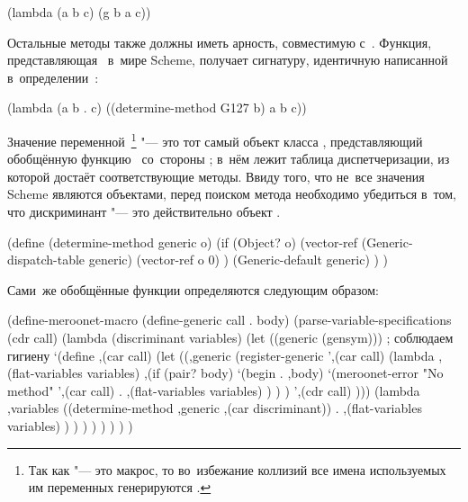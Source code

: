 \begin{code:lisp}
(lambda (a b c) (g b a c))
\end{code:lisp}

Остальные методы также должны иметь арность, совместимую с~.
Функция, представляющая~ в~мире Scheme, получает сигнатуру, идентичную
написанной в~определении~:

\begin{code:lisp}
(lambda (a b . c) ((determine-method G127 b) a b c))
\end{code:lisp}

Значение переменной~\footnote{Так как  "--- это
макрос, то во~избежание коллизий все имена используемых им  переменных
генерируются .} "--- это тот самый объект класса ,
представляющий обобщённую функцию~ со~стороны {\Meroonet}; в~нём лежит
таблица диспетчеризации, из которой  достаёт
соответствующие методы. Ввиду того, что не~все значения Scheme являются
объектами, перед поиском метода необходимо убедиться в~том, что дискриминант
"--- это действительно объект {\Meroonet}.

\begin{code:lisp}
(define (determine-method generic o)
  (if (Object? o)
      (vector-ref (Generic-dispatch-table generic)
                  (vector-ref o 0) )
      (Generic-default generic) ) )
\end{code:lisp}

Сами~же обобщённые функции определяются следующим образом:
%
\begin{code:lisp}
(define-meroonet-macro (define-generic call . body)
  (parse-variable-specifications
   (cdr call)
   (lambda (discriminant variables)
     (let ((generic (gensym)))      ; соблюдаем гигиену
       `(define ,(car call)
          (let ((,generic (register-generic
                           ',(car call)
                           (lambda ,(flat-variables variables)
                             ,(if (pair? body)
                                  `(begin . ,body)
                                  `(meroonet-error
                                    "No method" ',(car call)
                                    . ,(flat-variables variables) ) ) )
                           ',(cdr call) )))
            (lambda ,variables
              ((determine-method ,generic ,(car discriminant))
               . ,(flat-variables variables) ) ) ) ) ) ) ) )
\end{code:lisp}

